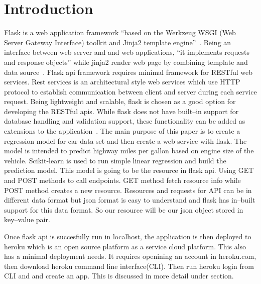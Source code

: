 \section{Introduction}
  Flask is a web application framework ``based on the Werkzeug WSGI (Web Server
  Gateway Interface) toolkit and Jinja2 template engine''~\cite{hid-sp18-415-flask}.
  Being an interface between web server and and web applications, 
  ``it implements requests and response objects'' while jinja2 render web page
  by combining template and data source~\cite{hid-sp18-415-flask}. 
  Flask api framework requires minimal framework for RESTful web services.
  Rest services is an architectural style web services which use HTTP protocol
  to establish communication between client and server during each service
  request.
  Being lightweight and scalable, flask is chosen as a good option for 
  developing the RESTful apis. While flask does not have built--in support for 
  database handling and validation support, these functionality can be added as
  extensions to the application~\cite{hid-sp18-415-flask}.
  The main purpose of this paper is
  to create a regression model for car data set and then create a web service
  with flask. The model is intended to
  predict highway miles per gallon based on engine size of the vehicle.
  Scikit-learn is used to run simple linear regression and build the prediction
  model. This model is going
  to be the resource in flask api. Using GET and POST methods to call
  endpoints. GET method fetch resource info while POST method creates
  a new resource. Resources and requests for API can be in different data
  format but json format
  is easy to understand and flask has in--built support for this data format. So 
  our resource will be our json object stored in key--value pair.
  
  Once flask api is succesfully run in localhost, the application is
  then deployed to heroku which is an open source platform as a 
  service cloud platform. This also has a minimal deployment needs.
  It requires openining an account in heroku.com, then download heroku
  command line interface(CLI). Then run heroku login from CLI and
  and create an app. This is discussed in more detail under  
  section.
  
 
 
